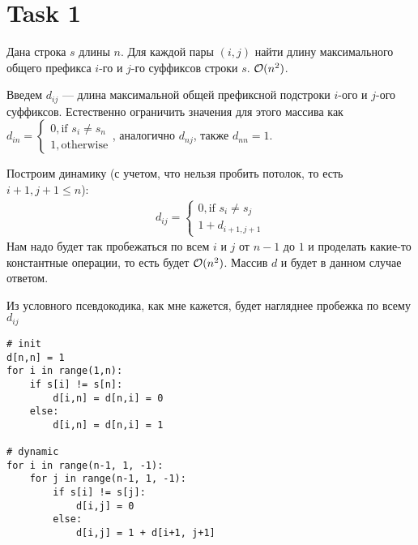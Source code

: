\section{Task 1}
\begin{task}
    Дана строка $s$ длины $n$. Для каждой пары $(i, j)$ найти длину максимального общего префикса $i$-го и $j$-го суффиксов строки $s$. $\mathcal{O}(n^2)$.
\end{task}

\begin{solution}
    Введем $d_{ij}$ --- длина максимальной общей префиксной подстроки $i$-ого и $j$-ого суффиксов.
    Естественно ограничить значения для этого массива как $d_{in} = \begin{cases}
        0, \text{if } s_i \neq s_n \\
        1, \text{otherwise}
    \end{cases}$, аналогично $d_{nj}$, также $d_{nn} = 1$.

    Построим динамику (с учетом, что нельзя пробить потолок, то есть $i+1,j+1 \leq n$):
    \begin{gather}
        d_{ij} = 
        \begin{cases}
            0, \text{if } s_i \neq s_j \\
            1 + d_{i+1,j+1}
        \end{cases}
    \end{gather}
    Нам надо будет так пробежаться по всем $i$ и $j$ от $n-1$ до $1$ и проделать какие-то константные операции, то есть будет $\mathcal{O}(n^2)$.
    Массив $d$ и будет в данном случае ответом.

    \begin{upd}
        Из условного псевдокодика, как мне кажется, будет нагляднее пробежка по всему $d_{ij}$
        \begin{lstlisting}
# init
d[n,n] = 1
for i in range(1,n):
    if s[i] != s[n]:
        d[i,n] = d[n,i] = 0
    else:
        d[i,n] = d[n,i] = 1

# dynamic
for i in range(n-1, 1, -1):
    for j in range(n-1, 1, -1):
        if s[i] != s[j]:
            d[i,j] = 0
        else:
            d[i,j] = 1 + d[i+1, j+1]
        \end{lstlisting}
    \end{upd}
\end{solution}
